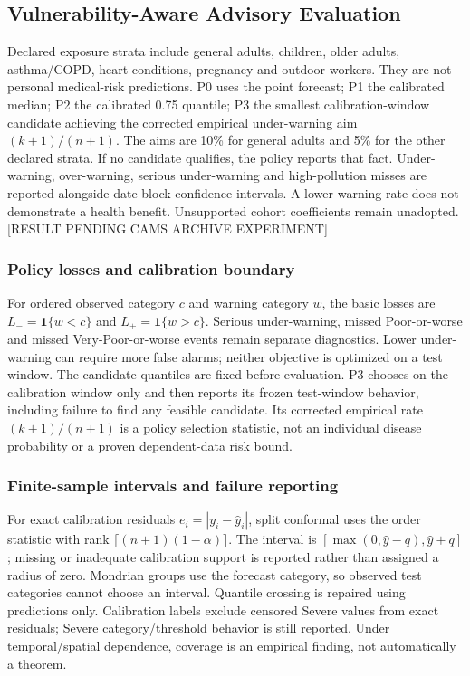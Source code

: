 \subsection{Vulnerability-Aware Advisory Evaluation}
Declared exposure strata include general adults, children, older adults,
asthma/COPD, heart conditions, pregnancy and outdoor workers. They are not
personal medical-risk predictions. P0 uses the point forecast; P1 the calibrated
median; P2 the calibrated 0.75 quantile; P3 the smallest calibration-window
candidate achieving the corrected empirical under-warning aim $(k+1)/(n+1)$.
The aims are 10\% for general adults and 5\% for the other declared strata.
If no candidate qualifies, the policy reports that fact.
Under-warning, over-warning, serious under-warning and high-pollution misses
are reported alongside date-block confidence intervals. A lower warning rate
does not demonstrate a health benefit. Unsupported cohort coefficients remain
unadopted. [RESULT PENDING CAMS ARCHIVE EXPERIMENT]
\subsubsection{Policy losses and calibration boundary}
For ordered observed category $c$ and warning category $w$, the basic losses
are $L_-=\mathbf{1}\{w<c\}$ and $L_+=\mathbf{1}\{w>c\}$.
Serious under-warning, missed Poor-or-worse and missed Very-Poor-or-worse
events remain separate diagnostics. Lower under-warning can require more
false alarms; neither objective is optimized on a test window.
The candidate quantiles are fixed before evaluation. P3 chooses on the
calibration window only and then reports its frozen test-window behavior,
including failure to find any feasible candidate. Its corrected empirical
rate $(k+1)/(n+1)$ is a policy selection statistic, not an individual disease
probability or a proven dependent-data risk bound.
\subsubsection{Finite-sample intervals and failure reporting}
For exact calibration residuals $e_i=|y_i-\widehat y_i|$, split conformal
uses the order statistic with rank $\lceil(n+1)(1-\alpha)\rceil$.
The interval is $[\max(0,\widehat y-q),\widehat y+q]$; missing or inadequate
calibration support is reported rather than assigned a radius of zero.
Mondrian groups use the forecast category, so observed test categories cannot
choose an interval. Quantile crossing is repaired using predictions only.
Calibration labels exclude censored Severe values from exact residuals;
Severe category/threshold behavior is still reported. Under temporal/spatial
dependence, coverage is an empirical finding, not automatically a theorem.
